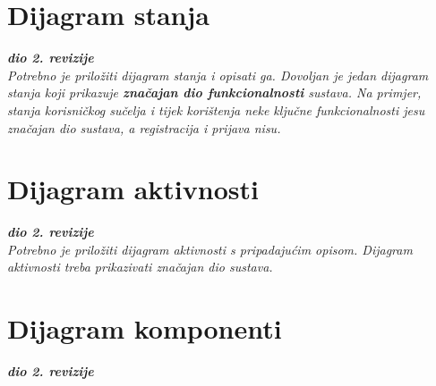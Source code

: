 			
			
			\eject
		
		\section{Dijagram stanja}
			
			
			\textbf{\textit{dio 2. revizije}}\\
			
			\textit{Potrebno je priložiti dijagram stanja i opisati ga. Dovoljan je jedan dijagram stanja koji prikazuje \textbf{značajan dio funkcionalnosti} sustava. Na primjer, stanja korisničkog sučelja i tijek korištenja neke ključne funkcionalnosti jesu značajan dio sustava, a registracija i prijava nisu. }
			
			
			\eject 
		
		\section{Dijagram aktivnosti}
			
			\textbf{\textit{dio 2. revizije}}\\
			
			 \textit{Potrebno je priložiti dijagram aktivnosti s pripadajućim opisom. Dijagram aktivnosti treba prikazivati značajan dio sustava.}
			
			\eject
		\section{Dijagram komponenti}
		
			\textbf{\textit{dio 2. revizije}}\\
		
